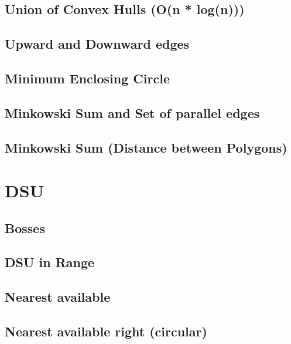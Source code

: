 \subsection{Union of Convex Hulls (O(n * log(n)))}
\raggedbottom
\hrulefill
\subsection{Upward and Downward edges}
\raggedbottom
\hrulefill
\subsection{Minimum Enclosing Circle}
\raggedbottom
\hrulefill
\subsection{Minkowski Sum and Set of parallel edges}
\raggedbottom
\hrulefill
\subsection{Minkowski Sum (Distance between Polygons)}
\raggedbottom
\hrulefill

\section{DSU}
\subsection{Bosses}
\raggedbottom
\hrulefill
\subsection{DSU in Range}
\raggedbottom
\hrulefill
\subsection{Nearest available}
\raggedbottom
\hrulefill
\subsection{Nearest available right (circular)}
\raggedbottom
\hrulefill

